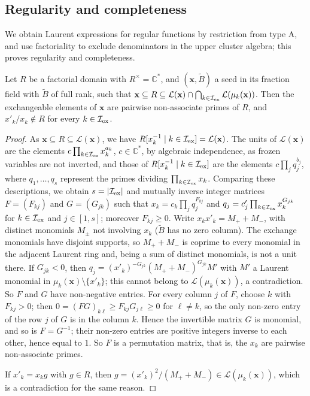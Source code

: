 \documentclass[a4paper]{amsart}
\numberwithin{equation}{section}
\theoremstyle{definition}
\theoremstyle{remark}
\newcommand{\bbC}{\mathbb{C}}
\newcommand{\mcL}{\mathcal{L}}
\newcommand{\mcI}{\mathcal{I}}
\newcommand{\bx}{\mathbf{x}}
\newcommand{\tB}{\widetilde{B}}
\newcommand{\ex}{{\rm ex}}
\begin{document}
\subsection{Regularity and completeness}
We obtain Laurent expressions for regular functions by restriction from type A, and use factoriality to exclude denominators in the upper cluster algebra; this proves regularity and completeness.

\begin{lemma}
  \label{lem: primes}
  Let $R$ be a factorial domain with $R^\times=\bbC^*$, and $(\bx,\tB)$ a seed in its fraction field with $\tB$ of full rank, such that $\bx\subseteq R\subseteq\mcL(\bx)\cap\bigcap_{k\in \mcI_\ex}\mcL(\mu_k(\bx))$.
  Then the exchangeable elements of $\bx$ are pairwise non-associate primes of $R$, and $x'_k/x_k\notin R$ for every $k\in \mcI_\ex$.
\end{lemma}
\begin{proof}
  As $\bx\subseteq R\subseteq\mcL(\bx)$, we have $R[x_k^{-1}\mid k\in \mcI_\ex]=\mcL(\bx)$.
  The units of $\mcL(\bx)$ are the elements $c\prod_{k\in \mcI_\ex}x_k^{a_k}$, $c\in\bbC^*$, by algebraic independence, as frozen variables are not inverted, and those of $R[x_k^{-1}\mid k\in \mcI_\ex]$ are the elements $c\prod_jq_j^{b_j}$, where $q_1,\dots,q_s$ represent the primes dividing $\prod_{k\in \mcI_\ex}x_k$.
  Comparing these descriptions, we obtain $s=|\mcI_\ex|$ and mutually inverse integer matrices $F=(F_{kj})$ and $G=(G_{jk})$ such that $x_k=c_k\prod_jq_j^{F_{kj}}$ and $q_j=c'_j\prod_{k\in \mcI_\ex}x_k^{G_{jk}}$ for $k\in \mcI_\ex$ and $j\in[1,s]$; moreover $F_{kj}\ge0$.
  Write $x_kx'_k=M_++M_-$, with distinct monomials $M_\pm$ not involving $x_k$ ($\tB$ has no zero column).
  The exchange monomials have disjoint supports, so $M_++M_-$ is coprime to every monomial in the adjacent Laurent ring and, being a sum of distinct monomials, is not a unit there.
  If $G_{jk}<0$, then $q_j=(x'_k)^{-G_{jk}}(M_++M_-)^{G_{jk}}M'$ with $M'$ a Laurent monomial in $\mu_k(\bx)\setminus\{x'_k\}$; this cannot belong to $\mcL(\mu_k(\bx))$, a contradiction.
  So $F$ and $G$ have non-negative entries.
  For every column $j$ of $F$, choose $k$ with $F_{kj}>0$; then $0=(FG)_{k\ell}\ge F_{kj}G_{j\ell}\ge0$ for $\ell\neq k$, so the only non-zero entry of the row $j$ of $G$ is in the column $k$.
  Hence the invertible matrix $G$ is monomial, and so is $F=G^{-1}$; their non-zero entries are positive integers inverse to each other, hence equal to $1$.
  So $F$ is a permutation matrix, that is, the $x_k$ are pairwise non-associate primes.

  If $x'_k=x_kg$ with $g\in R$, then $g=(x'_k)^2/(M_++M_-)\in\mcL(\mu_k(\bx))$, which is a contradiction for the same reason.
\end{proof}
\end{document}
